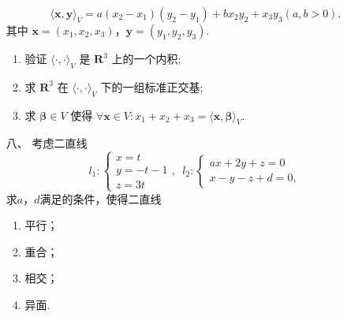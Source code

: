 \begin{enumerate}
    \[ \langle \boldsymbol{x}, \boldsymbol{y} \rangle_V = a(x_2-x_1)(y_2-y_1)+bx_2y_2+x_3y_3(a,b>0). \]
    其中 $ \boldsymbol{x} = (x_1, x_2, x_3) $，$ \boldsymbol{y} = (y_1, y_2, y_3) $.
    \begin{enumerate}[label=(\arabic*)]
        \item 验证 $ \langle \cdot, \cdot \rangle_V $ 是 $ \mathbf{R}^3 $ 上的一个内积;
        \item 求 $ \mathbf{R}^3 $ 在 $ \langle \cdot, \cdot \rangle_V $ 下的一组标准正交基;
        \item 求 $ \boldsymbol{\beta} \in V $ 使得 $ \forall \boldsymbol{x} \in V: x_1 + x_2 + x_3 = \langle \boldsymbol{x}, \boldsymbol{\beta} \rangle_V $.
    \end{enumerate}
    \item[八、]考虑二直线
    \[l_1:\begin{cases}
        x=t \\ y=-t-1 \\ z=3t
    \end{cases},\enspace l_2:\begin{cases}
        ax+2y+z=0 \\ x-y-z+d=0,
    \end{cases}\]
    求$a$，$d$满足的条件，使得二直线
    \begin{enumerate}[label=(\arabic*)]
        \item 平行；
        \item 重合；
        \item 相交；
        \item 异面.
    \end{enumerate}
\end{enumerate}


\newpage
